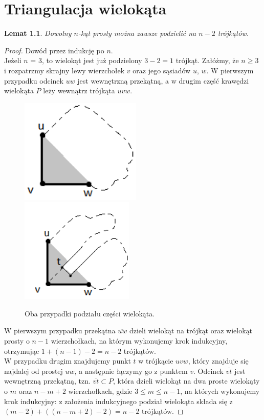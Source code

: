 \documentclass[brudnopis]{xmgr}
\newtheorem{Lemat}{Lemat}
\theoremstyle{definition}
\begin{document}
\chapter{Triangulacja wielokąta}\label{triangulacja}
\begin{Lemat}\label{podzial na trojkaty}
Dowolny $n$-kąt prosty można zawsze podzielić na $n-2$ trójkątów.
\end{Lemat}
\begin{proof}
	Dowód przez indukcję po $n$.
	\\Jeżeli $n$ = 3, to wielokąt jest już podzielony $3 - 2 = 1$ trójkąt.
	Załóżmy, że $n \ge 3$ i rozpatrzmy skrajny lewy wierzchołek $v$ oraz jego sąsiadów $u$, $w$.
	W pierwszym przypadku odcinek $uw$ jest wewnętrzną przekątną, a w drugim część krawędzi wielokąta $P$ leży wewnątrz trójkąta $uvw$.

  \begin{figure}[ht!]
    \centering
    \includegraphics[height=5cm]{rysunki/triangulacja_1.png}
    \includegraphics[height=5cm]{rysunki/triangulacja_2.png}
    \caption{Oba przypadki podziału części wielokąta.}
  \end{figure} 
	
	\indent W pierwszym przypadku przekątna $\overline{u w}$ dzieli wielokąt na trójkąt oraz wielokąt prosty o $n - 1$ wierzchołkach, na którym wykonujemy krok indukcyjny, otrzymując $1 + (n - 1) -2 = n - 2$ trójkątów.
	\\\indent W przypadku drugim znajdujemy punkt $t$ w trójkącie $uvw$, który znajduje się najdalej od prostej $uw$, a następnie łączymy go z punktem $v$. Odcinek $\overline{v t}$ jest wewnętrzną przekątną, tzn. $\overline{vt} \subset P$, która dzieli wielokąt na dwa proste wielokąty o $m$ oraz $n - m + 2$ wierzchołkach, gdzie $3 \le m \le n-1$, na których wykonujemy krok indukcyjny: z założenia indukcyjnego podział wielokąta składa się z $(m - 2) + ((n - m + 2) -2) = n - 2$ trójkątów.
\end{proof}
\end{document}
